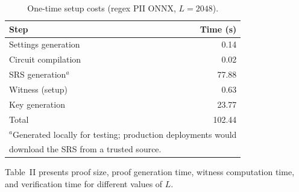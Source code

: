 \documentclass[10pt,conference,a4paper]{IEEEtran}
\begin{document}
\begin{table}[htbp]
\centering
\caption{One-time setup costs (regex PII ONNX, $L=2048$).}
\label{tab:setup}
\begin{tabular}{l r}
\hline
\hline
Step & Time (s) \\
\hline
Settings generation & 0.14 \\
Circuit compilation & 0.02 \\
SRS generation$^{a}$ & 77.88 \\
Witness (setup) & 0.63 \\
Key generation & 23.77 \\
\hline
Total & 102.44 \\
\hline
\hline
\multicolumn{2}{l}{\small $^{a}$Generated locally for testing; production deployments would} \\
\multicolumn{2}{l}{\small download the SRS from a trusted source.} \\
\end{tabular}
\end{table}

Table~II presents proof size, proof generation time, witness computation time, and verification time for different values of $L$.
\end{document}
